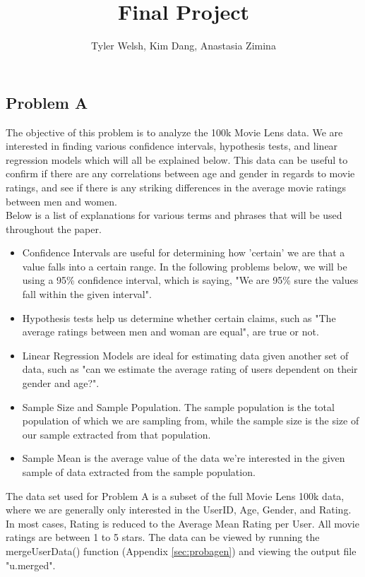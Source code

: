 \documentclass[11pt]{article}  %
\title{\textbf{Final Project}}
\author{Tyler Welsh, Kim Dang, Anastasia Zimina}
\date{}
\begin{document}

\maketitle
\tableofcontents

\newpage
\begin{center}
\section*{Problem A}
\end{center}

\indent The objective of this problem is to analyze the 100k Movie Lens data. We are interested in finding various confidence intervals, hypothesis tests, and linear regression models which will all be explained below. This data can be useful to confirm if there are any correlations between age and gender in regards to movie ratings, and see if there is any striking differences in the average movie ratings between men and women.\\
\indent Below is a list of explanations for various terms and phrases that will be used throughout the paper.
\begin{itemize}
    \item Confidence Intervals are useful for determining how 'certain' we are that a value falls into a certain range. In the following problems below, we will be using a 95\% confidence interval, which is saying, "We are 95\% sure the values fall within the given interval".
    
    \item Hypothesis tests help us determine whether certain claims, such as "The average ratings between men and woman are equal", are true or not.
    
    \item Linear Regression Models are ideal for estimating data given another set of data, such as "can we estimate the average rating of users dependent on their gender and age?".
    \item Sample Size and Sample Population. The sample population is the total population of which we are sampling from, while the sample size is the size of our sample extracted from that population. 
    
    \item Sample Mean is the average value of the data we're interested in the given sample of data extracted from the sample population.
    
\end{itemize}
\indent The data set used for Problem A is a subset of the full Movie Lens 100k data, where we are generally only interested in the UserID, Age, Gender, and Rating. In most cases, Rating is reduced to the Average Mean Rating per User. All movie ratings are between 1 to 5 stars. The data can be viewed by running the mergeUserData() function (Appendix \ref{sec:probagen}) and viewing the output file "u.merged".
\end{document}
